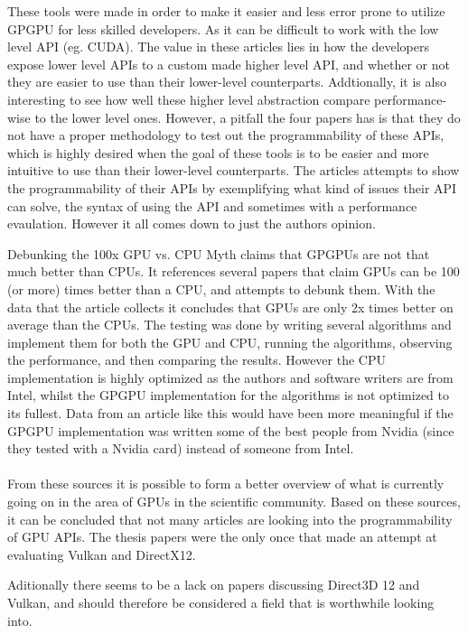 These tools were made in order to make it easier and less error prone to utilize GP\gls{GPU} for less skilled developers.
As it can be difficult to work with the low level \gls{API} (eg. CUDA).
The value in these articles lies in how the developers expose lower level \glspl{API} to a custom made higher level \gls{API}, and whether or not they are easier to use than their lower-level counterparts. 
Addtionally, it is also interesting to see how well these higher level abstraction compare performance-wise to the lower level ones. 
However, a pitfall the four papers has is that they do not have a proper methodology to test out the programmability of these \glspl{API}, which is highly desired when the goal of these tools is to be easier and more intuitive to use than their lower-level counterparts.
The articles attempts to show the programmability of their \glspl{API} by exemplifying what kind of issues their \gls{API} can solve, the syntax of using the \gls{API} and sometimes with a performance evaulation.
However it all comes down to just the authors opinion.

Debunking the 100x \gls{GPU} vs. \gls{CPU} Myth \cite{lee_2010_debunking} claims that GP\glspl{GPU} are not that much better than \glspl{CPU}. 
It references several papers that claim \glspl{GPU} can be 100 (or more) times better than a \gls{CPU}, and attempts to debunk them. 
With the data that the article collects it concludes that \glspl{GPU} are only 2x times better on average than the \glspl{CPU}. 
The testing was done by writing several algorithms and implement them for both the \gls{GPU} and \gls{CPU}, running the algorithms, observing the performance, and then comparing the results. 
However the \gls{CPU} implementation is highly optimized as the authors and software writers are from Intel, whilst the GP\gls{GPU} implementation for the algorithms is not optimized to its fullest. 
Data from an article like this would have been more meaningful if the GP\gls{GPU} implementation was written some of the best people from Nvidia (since they tested with a Nvidia card) instead of someone from Intel.

\paragraph{}
From these sources it is possible to form a better overview of what is currently going on in the area of \glspl{GPU} in the scientific community. 
Based on these sources, it can be concluded that not many articles are looking into the programmability of \gls{GPU} \glspl{API}. 
The thesis papers were the only once that made an attempt at evaluating Vulkan and DirectX12.

Aditionally there seems to be a lack on papers discussing Direct3D 12 and Vulkan, and should therefore be considered a field that is worthwhile looking into.
